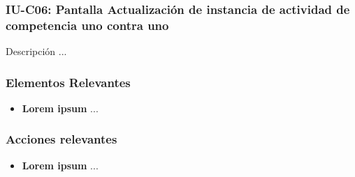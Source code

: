 
\subsubsection{IU-C06: Pantalla Actualización de instancia de actividad de competencia uno contra uno}

 Descripción ...


\subsubsection{Elementos Relevantes}

    \begin{itemize}
    \item {\bf Lorem ipsum}
        ...
    \end{itemize}

\subsubsection{Acciones relevantes}

    \begin{itemize}
    \item {\bf Lorem ipsum}
        ...
    \end{itemize}

\clearpage
